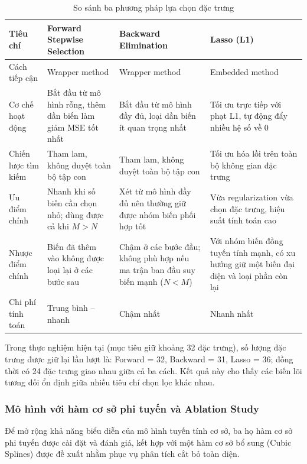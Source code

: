 \begin{table}[H]
    \centering
    \caption{So sánh ba phương pháp lựa chọn đặc trưng}
    \label{tab:feature_selection_method_comparison}
    \renewcommand{\arraystretch}{1.25}
    \begin{tabular}{|p{3.0cm}|p{4.0cm}|p{4.0cm}|p{4.0cm}|}
        \hline
        \textbf{Tiêu chí} & \textbf{Forward Stepwise Selection} & \textbf{Backward Elimination} & \textbf{Lasso (L1)} \\ \hline
        Cách tiếp cận & Wrapper method & Wrapper method & Embedded method \\ \hline
        Cơ chế hoạt động & Bắt đầu từ mô hình rỗng, thêm dần biến làm giảm MSE tốt nhất & Bắt đầu từ mô hình đầy đủ, loại dần biến ít quan trọng nhất & Tối ưu trực tiếp với phạt L1, tự động đẩy nhiều hệ số về 0 \\ \hline
        Chiến lược tìm kiếm & Tham lam, không duyệt toàn bộ tập con & Tham lam, không duyệt toàn bộ tập con & Tối ưu hóa lồi trên toàn bộ không gian đặc trưng \\ \hline
        Ưu điểm chính & Nhanh khi số biến cần chọn nhỏ; dùng được cả khi $M>N$ & Xét từ mô hình đầy đủ nên thường giữ được nhóm biến phối hợp tốt & Vừa regularization vừa chọn đặc trưng, hiệu suất tính toán cao \\ \hline
        Nhược điểm chính & Biến đã thêm vào không được loại lại ở các bước sau & Chậm ở các bước đầu; không phù hợp nếu ma trận ban đầu suy biến mạnh ($N<M$) & Với nhóm biến đồng tuyến tính mạnh, có xu hướng giữ một biến đại diện và loại phần còn lại \\ \hline
        Chi phí tính toán & Trung bình -- nhanh & Chậm nhất & Nhanh nhất \\ \hline
    \end{tabular}
\end{table}

Trong thực nghiệm hiện tại (mục tiêu giữ khoảng 32 đặc trưng), số lượng đặc trưng được giữ lại lần lượt là:
Forward = 32, Backward = 31, Lasso = 36; đồng thời có 24 đặc trưng giao nhau giữa cả ba cách.
Kết quả này cho thấy các biến lõi tương đối ổn định giữa nhiều tiêu chí chọn lọc khác nhau.

\subsubsection{Mô hình với hàm cơ sở phi tuyến và Ablation Study}

Để mở rộng khả năng biểu diễn của mô hình tuyến tính cơ sở, ba họ hàm cơ sở 
phi tuyến được cài đặt và đánh giá, kết hợp với một hàm cơ sở bổ sung (Cubic 
Splines) được đề xuất nhằm phục vụ phân tích cắt bỏ toàn diện.

